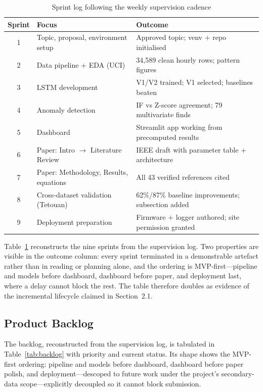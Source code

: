 \documentclass[11pt,a4paper]{article}
\begin{document}
\begin{table}[htbp]
\centering
\caption{Sprint log following the weekly supervision cadence}
\label{tab:sprint}
\small
\renewcommand{\arraystretch}{1.3}
\begin{tabular}{|c|p{6.2cm}|p{6.6cm}|}
\hline
\textbf{Sprint} & \textbf{Focus} & \textbf{Outcome}\\ \hline
1 & Topic, proposal, environment setup & Approved topic; venv $+$ repo initialised\\ \hline
2 & Data pipeline $+$ EDA (UCI) & 34{,}589 clean hourly rows; pattern figures\\ \hline
3 & LSTM development & V1/V2 trained; V1 selected; baselines beaten\\ \hline
4 & Anomaly detection & IF vs Z-score agreement; 79 multivariate finds\\ \hline
5 & Dashboard & Streamlit app working from precomputed results\\ \hline
6 & Paper: Intro $\to$ Literature Review & IEEE draft with parameter table $+$ architecture\\ \hline
7 & Paper: Methodology, Results, equations & All 43 verified references cited\\ \hline
8 & Cross-dataset validation (Tetouan) & 62\%/87\% baseline improvements; subsection added\\ \hline
9 & Deployment preparation & Firmware $+$ logger authored; site permission granted\\ \hline
\end{tabular}
\end{table}

Table~\ref{tab:sprint} reconstructs the nine sprints from the supervision log. Two properties are visible in the outcome column: every sprint terminated in a demonstrable artefact rather than in reading or planning alone, and the ordering is MVP-first---pipeline and models before dashboard, dashboard before paper, and deployment last, where a delay cannot block the rest. The table therefore doubles as evidence of the incremental lifecycle claimed in Section~2.1.



\subsection{Product Backlog}
The backlog, reconstructed from the supervision log, is tabulated in
Table~\ref{tab:backlog} with priority and current status. Its shape shows the MVP-first
ordering: pipeline and models before dashboard, dashboard before paper polish,
and deployment---descoped to future work under the project's secondary-data
scope---explicitly decoupled so it cannot block submission.
\end{document}
